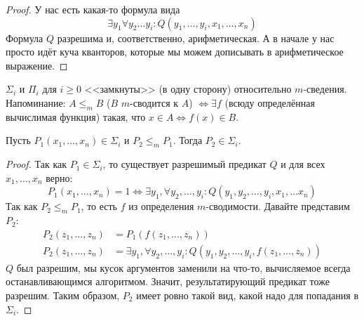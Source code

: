 	\begin{proof}
		У нас есть какая-то формула вида
		\[\exists y_1 \forall y_2 \dots y_i \colon Q(y_1, \dots, y_i, x_1, \dots, x_n)\]
		Формула $Q$ разрешима и, соответственно, арифметическая.
		А в начале у нас просто идёт куча кванторов, которые мы можем дописывать в арифметическое выражение.
	\end{proof}

\item\label{mReducibleInvariant}
	$\Sigma_i$ и $\Pi_i$ для $i \ge 0$ <<замкнуты>> (в одну сторону) относительно $m$-сведения.
	Напоминание: $A \le_m B $ ($B$ $m$-сводится к $A$) $\iff \exists f$ (всюду определённая вычислимая функция) такая,
	что $x \in A \iff f(x) \in B$.

	\begin{assertion}
		Пусть $P_1(x_1, \dots, x_n) \in \Sigma_i$ и $P_2 \le_m P_1$.
		Тогда $P_2 \in \Sigma_i$.
	\end{assertion}
	\begin{proof}
		Так как $P_1 \in \Sigma_i$, то существует разрешимый предикат $Q$ и для всех $x_1, \dots, x_n$ верно:
		\[ P_1(x_1, \dots, x_n)=1 \iff \exists y_1, \forall y_2, \dots, y_i \colon Q(y_1, y_2, \dots, y_i, x_1, \dots x_n) \]
		Так как $P_2 \le_m P_1$, то есть $f$ из определения $m$-сводимости.
		Давайте представим $P_2$:
		\begin{align*}
		P_2(z_1, \dots, z_n) &= P_1(f(z_1, \dots, z_n)) \\
		P_2(z_1, \dots, z_n) &= \exists y_1, \forall y_2, \dots, y_i \colon Q(y_1, y_2, \dots, y_i, f(z_1, \dots, z_n))
		\end{align*}
		$Q$ был разрешим, мы кусок аргументов заменили на что-то, вычисляемое всегда останавливающимся
		алгоритмом.
		Значит, результатирующий предикат тоже разрешим.
		Таким образом, $P_2$ имеет ровно такой вид, какой надо для попадания в $\Sigma_i$.
	\end{proof}

